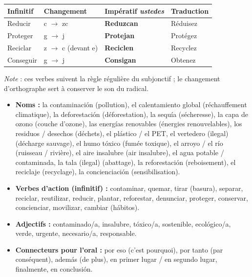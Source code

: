 \documentclass[11pt]{article}
\newcommand{\cle}[1]{{\popxbold\color{popdark}#1}}
\begin{document}
\begin{propriete}
\begin{center}
\begin{tabular}{|l|l|l|l|}
\hline
\rowcolor{popblueL} \textbf{Infinitif} & \textbf{Changement} & \textbf{Impératif \emph{ustedes}} & \textbf{Traduction} \\
\hline
Reducir & c $\to$ zc & \textbf{Reduzcan} & Réduisez \\
Proteger & g $\to$ j & \textbf{Protejan} & Protégez \\
Reciclar & z $\to$ c (devant e) & \textbf{Reciclen} & Recyclez \\
Conseguir & g $\to$ j & \textbf{Consigan} & Obtenez \\
\hline
\end{tabular}
\end{center}
\emph{Note} : ces verbes suivent la règle régulière du subjonctif ; le changement d'orthographe sert à conserver le son du radical.
\end{propriete}

\begin{definition}
\begin{itemize}
    \item \textbf{Noms :} \cle{la contaminación} (pollution), \cle{el calentamiento global} (réchauffement climatique), \cle{la deforestación} (déforestation), \cle{la sequía} (sécheresse), \cle{la capa de ozono} (couche d'ozone), \cle{las energías renovables} (énergies renouvelables), \cle{los residuos / desechos} (déchets), \cle{el plástico / el PET}, \cle{el vertedero (ilegal)} (décharge sauvage), \cle{el humo tóxico} (fumée toxique), \cle{el arroyo / el río} (ruisseau / rivière), \cle{el aire insalubre} (air insalubre), \cle{el agua potable / contaminada}, \cle{la tala (ilegal)} (abattage), \cle{la reforestación} (reboisement), \cle{el reciclaje} (recyclage), \cle{la concienciación} (sensibilisation).
    \item \textbf{Verbes d'action (infinitif) :} \cle{contaminar}, \cle{quemar}, \cle{tirar (basura)}, \cle{separar}, \cle{reciclar}, \cle{reutilizar}, \cle{reducir}, \cle{plantar}, \cle{reforestar}, \cle{denunciar}, \cle{proteger}, \cle{conservar}, \cle{concienciar}, \cle{movilizar}, \cle{cambiar (hábitos)}.
    \item \textbf{Adjectifs :} \cle{contaminado/a}, \cle{insalubre}, \cle{tóxico/a}, \cle{sostenible}, \cle{ecológico/a}, \cle{verde}, \cle{urgente}, \cle{necesario/a}, \cle{responsable}.
    \item \textbf{Connecteurs pour l'oral :} \cle{por eso} (c'est pourquoi), \cle{por tanto} (par conséquent), \cle{además} (de plus), \cle{en primer lugar / en segundo lugar}, \cle{finalmente}, \cle{en conclusión}.
\end{itemize}
\end{definition}
\end{document}
